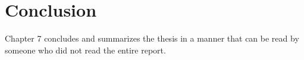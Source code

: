 \chapter{Conclusion}
\label{ch:conclusion}
Chapter 7 concludes and summarizes the thesis in a manner that can be read by someone who did not read the entire report.
